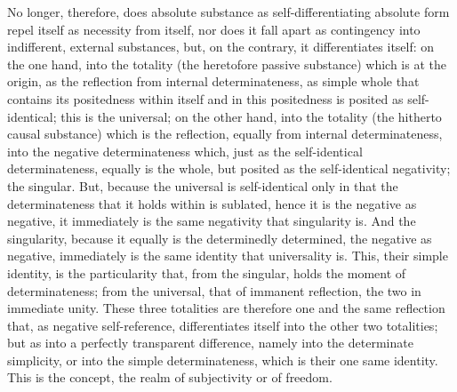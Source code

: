 No longer, therefore, does absolute substance
as self-differentiating absolute form
repel itself as necessity from itself,
nor does it fall apart as contingency
into indifferent, external substances,
but, on the contrary, it differentiates itself:
on the one hand, into the totality
(the heretofore passive substance)
which is at the origin,
as the reflection from internal determinateness,
as simple whole that contains its positedness within itself
and in this positedness is posited as self-identical;
this is the universal;
on the other hand, into the totality
(the hitherto causal substance)
which is the reflection,
equally from internal determinateness,
into the negative determinateness
which, just as the self-identical determinateness,
equally is the whole,
but posited as the self-identical negativity;
the singular.
But, because the universal is self-identical
only in that the determinateness that it holds within is sublated,
hence it is the negative as negative,
it immediately is the same negativity that singularity is.
And the singularity, because it equally is
the determinedly determined, the negative as negative,
immediately is the same identity that universality is.
This, their simple identity, is the particularity that,
from the singular, holds the moment of determinateness;
from the universal, that of immanent reflection,
the two in immediate unity.
These three totalities are therefore one and the same reflection
that, as negative self-reference, differentiates itself
into the other two totalities;
but as into a perfectly transparent difference,
namely into the determinate simplicity,
or into the simple determinateness,
which is their one same identity.
This is the concept,
the realm of subjectivity or of freedom.
